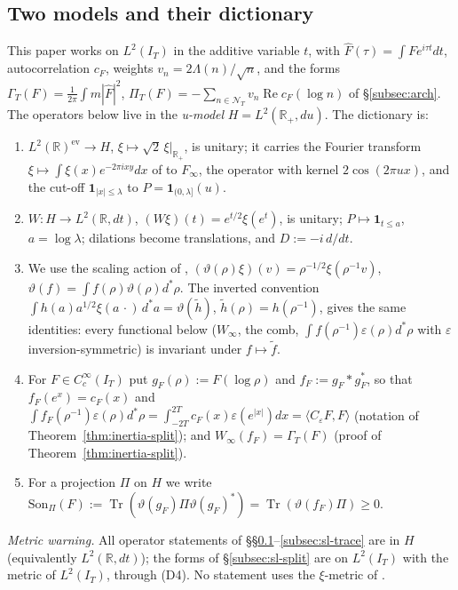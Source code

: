 \documentclass[11pt]{amsart}
\theoremstyle{definition}
\theoremstyle{remark}
\newcommand{\R}{\mathbb R}
\newcommand{\Rel}{\operatorname{Re}}
\newcommand{\IT}{I_T}
\newcommand{\Fh}{\widehat F}
\newcommand{\cF}{c_F}
\newcommand{\NT}{\mathcal N_T}
\newcommand{\PiT}{\Pi_T}
\begin{document}
\subsection{Two models and their dictionary}\label{subsec:sl-dict}
This paper works on $L^2(\IT)$ in the additive variable $t$, with $\Fh(\tau)=\int Fe^{i\tau t}dt$,
autocorrelation $\cF$, weights $v_n=2\Lambda(n)/\sqrt n$, and the forms
$\Gamma_T(F)=\frac1{2\pi}\int m|\Fh|^2$, $\PiT(F)=-\sum_{n\in\NT}v_n\Rel\cF(\log n)$ of
\S\ref{subsec:arch}. The operators below live in the \emph{u-model} $H=L^2(\R_+,du)$. The dictionary is:
\begin{enumerate}
\item[(D1)] $L^2(\R)^{\mathrm{ev}}\to H$, $\xi\mapsto\sqrt2\,\xi|_{\R_+}$, is unitary; it carries the
Fourier transform $\xi\mapsto\int\xi(x)e^{-2\pi ixy}dx$ of \cite{ConnesConsani2021} to $F_\infty$, the
operator with kernel $2\cos(2\pi ux)$, and the cut-off $\mathbf 1_{|x|\le\lambda}$ to
$P=\mathbf 1_{(0,\lambda]}(u)$.
\item[(D2)] $W:H\to L^2(\R,dt)$, $(W\xi)(t)=e^{t/2}\xi(e^t)$, is unitary; $P\mapsto\mathbf 1_{t\le a}$,
$a=\log\lambda$; dilations become translations, and $D:=-i\,d/dt$.
\item[(D3)] We use the scaling action of \cite[(61)]{ConnesConsani2021},
$(\vartheta(\rho)\xi)(v)=\rho^{-1/2}\xi(\rho^{-1}v)$, $\vartheta(f)=\int f(\rho)\vartheta(\rho)d^*\rho$. The
inverted convention $\int h(a)a^{1/2}\xi(a\,\cdot)\,d^*a=\vartheta(\tilde h)$, $\tilde h(\rho)=h(\rho^{-1})$, gives the
same identities: every functional below ($W_\infty$, the comb, $\int f(\rho^{-1})\varepsilon(\rho)d^*\rho$ with
$\varepsilon$ inversion-symmetric) is invariant under $f\mapsto\tilde f$.
\item[(D4)] For $F\in C_c^\infty(\IT)$ put $g_F(\rho):=F(\log\rho)$ and $f_F:=g_F*g_F^*$, so that
$f_F(e^x)=\cF(x)$ and $\int f_F(\rho^{-1})\varepsilon(\rho)d^*\rho=\int_{-2T}^{2T}\cF(x)\varepsilon(e^{|x|})dx
=\langle C_\varepsilon F,F\rangle$ (notation of Theorem~\ref{thm:inertia-split}); and
$W_\infty(f_F)=\Gamma_T(F)$ (proof of Theorem~\ref{thm:inertia-split}).
\item[(D5)] For a projection $\Pi$ on $H$ we write $\mathrm{Son}_\Pi(F):=\operatorname{Tr}(\vartheta(g_F)\Pi\vartheta(g_F)^*)
=\operatorname{Tr}(\vartheta(f_F)\Pi)\ge0$.
\end{enumerate}
\emph{Metric warning.} All operator statements of \S\S\ref{subsec:sl-dict}--\ref{subsec:sl-trace} are in $H$
(equivalently $L^2(\R,dt)$); the forms of \S\ref{subsec:sl-split} are on $L^2(\IT)$ with the metric of
$L^2(\IT)$, through (D4). No statement uses the $\xi$-metric of \cite[\S6]{ConnesConsani2021}.
\end{document}
